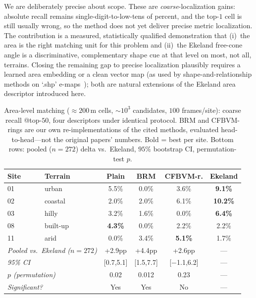 \documentclass[10pt]{article}
\theoremstyle{plain}
\theoremstyle{definition}
\begin{document}
We are deliberately precise about scope. These are \emph{coarse}-localization
gains: absolute recall remains single-digit-to-low-tens of percent, and the
top-$1$ cell is still usually wrong, so the method does not yet deliver precise
metric localization. The contribution is a measured, statistically qualified
demonstration that (i)~the area is the right matching unit for this problem
and (ii)~the Ekeland free-cone angle is a discriminative, complementary shape
cue at that level on most, not all, terrains. Closing the remaining gap to
precise localization plausibly requires a learned area embedding or a clean
vector map (as used by shape-and-relationship methods on `.shp'
e-maps~\cite{ssrm2024}); both are natural extensions of the Ekeland area
descriptor introduced here.

\begin{table}[htbp]
\caption{Area-level matching ($\approx200$\,m cells, ${\sim}10^{3}$ candidates,
  $100$ frames/site): coarse recall @top-$50$, four descriptors under
  identical protocol. BRM and CFBVM-rings are our own re-implementations of
  the cited methods, evaluated head-to-head---not the original papers'
  numbers. Bold = best per site. Bottom rows: pooled ($n{=}272$) delta vs.\
  Ekeland, $95\%$ bootstrap CI, permutation-test $p$.}
\label{tab:area}
\centering\small
\setlength{\tabcolsep}{4pt}
\begin{tabular}{llcccc}
\toprule
\textbf{Site} & \textbf{Terrain} & \textbf{Plain} & \textbf{BRM} & \textbf{CFBVM-r.} & \textbf{Ekeland} \\
\midrule
01 & urban   & 5.5\%  & 0.0\%  & 3.6\%  & \textbf{9.1\%}  \\
02 & coastal & 2.0\%  & 2.0\%  & 6.1\%  & \textbf{10.2\%} \\
03 & hilly   & 3.2\%  & 1.6\%  & 0.0\%  & \textbf{6.4\%}  \\
08 & built-up& \textbf{4.3\%} & 0.0\% & 2.2\% & 2.2\% \\
11 & arid    & 0.0\%  & 3.4\%  & \textbf{5.1\%} & 1.7\%  \\
\midrule
\multicolumn{2}{l}{\textit{Pooled vs.\ Ekeland ($n{=}272$)}} & +2.9pp & +4.4pp & +2.6pp & --- \\
\multicolumn{2}{l}{\textit{95\% CI}} & [0.7,5.1] & [1.5,7.7] & [$-$1.1,6.2] & --- \\
\multicolumn{2}{l}{\textit{$p$ (permutation)}} & 0.02 & 0.012 & 0.23 & --- \\
\multicolumn{2}{l}{\textit{Significant?}} & Yes & Yes & No & --- \\
\bottomrule
\end{tabular}
\end{table}
\end{document}
